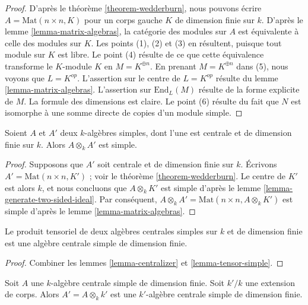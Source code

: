 \begin{proof}
D'après le
théorème \ref{theorem-wedderburn},
nous pouvons écrire $A = \text{Mat}(n \times n, K)$ pour un corps gauche $K$
de dimension finie sur $k$. D'après le
lemme \ref{lemma-matrix-algebras},
la catégorie des modules sur $A$ est équivalente à celle des modules sur
$K$. Les points (1), (2) et (3) en résultent, puisque tout module sur $K$ est
libre. Le point (4) résulte de ce que cette équivalence transforme le $K$-module
$K$ en $M = K^{\oplus n}$. En prenant $M = K^{\oplus n}$ dans (5),
nous voyons que $L = K^{op}$. L'assertion sur le centre de $L = K^{op}$
résulte du
lemme \ref{lemma-matrix-algebras}.
L'assertion sur $\text{End}_L(M)$ résulte de la forme explicite de $M$.
La formule des dimensions est claire.
Le point (6) résulte du fait que $N$ est isomorphe à une somme directe de
copies d'un module simple.
\end{proof}

\begin{lemma}
\label{lemma-tensor-simple}
Soient $A$ et $A'$ deux $k$-algèbres simples, dont l'une est centrale et de
dimension finie sur $k$. Alors $A \otimes_k A'$ est simple.
\end{lemma}

\begin{proof}
Supposons que $A'$ soit centrale et de dimension finie sur $k$.
Écrivons $A' = \text{Mat}(n \times n, K')$ ; voir le
théorème \ref{theorem-wedderburn}.
Le centre de $K'$ est alors $k$, et nous concluons que
$A \otimes_k K'$ est simple d'après le
lemme \ref{lemma-generate-two-sided-ideal}.
Par conséquent, $A \otimes_k A' = \text{Mat}(n \times n, A \otimes_k K')$
est simple d'après le lemme \ref{lemma-matrix-algebras}.
\end{proof}

\begin{lemma}
\label{lemma-tensor-central-simple}
Le produit tensoriel de deux algèbres centrales simples sur $k$ et de
dimension finie est une algèbre centrale simple de dimension finie.
\end{lemma}

\begin{proof}
Combiner les lemmes \ref{lemma-centralizer} et \ref{lemma-tensor-simple}.
\end{proof}

\begin{lemma}
\label{lemma-base-change}
Soit $A$ une $k$-algèbre centrale simple de dimension finie.
Soit $k'/k$ une extension de corps. Alors $A' = A \otimes_k k'$ est une
$k'$-algèbre centrale simple de dimension finie.
\end{lemma}

